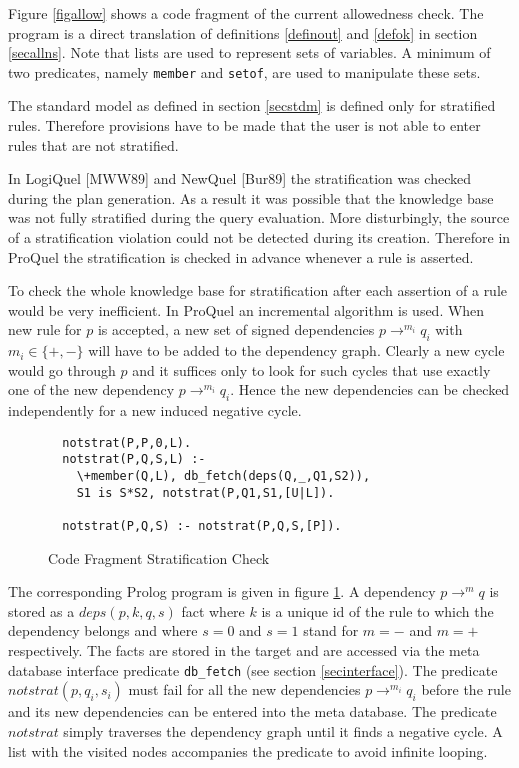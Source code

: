 Figure \ref{figallow} shows a code fragment of the current allowedness check. The program is a 
direct translation of definitions \ref{definout} and \ref{defok} in section \ref{secallns}. 
Note that lists are used to represent sets of variables. A minimum of two predicates, namely 
\verb.member. and \verb.setof., are used to manipulate these sets.

\label{secstratc}
The standard model as defined in section \ref{secstdm} is defined only for stratified rules. 
Therefore provisions have to be made that the user is not able to enter rules that are not 
stratified.

In LogiQuel [MWW89] and NewQuel [Bur89] the stratification was checked during the plan generation. 
As a result it was possible that the knowledge base was not fully stratified during the query 
evaluation. More disturbingly, the source of a stratification violation could not be detected 
during its creation. Therefore in ProQuel the stratification is checked  in advance whenever 
a rule is asserted.

To check the whole knowledge base for stratification after each assertion of a rule would be
very inefficient. In ProQuel an incremental algorithm is used. When new rule for $p$ is accepted,
a new set of signed dependencies $p \rightarrow^{m_i} q_i$ with $m_i \in \{+,-\}$ will have to be 
added to the dependency graph. Clearly a new cycle would go through $p$ and it suffices only to look
for such cycles that use exactly one of the new dependency $p \rightarrow^{m_i} q_i$. Hence the 
new dependencies can be checked independently for a new induced negative cycle.

\begin{figure}
{\small
\begin{verbatim}
  notstrat(P,P,0,L).
  notstrat(P,Q,S,L) :- 
    \+member(Q,L), db_fetch(deps(Q,_,Q1,S2)), 
    S1 is S*S2, notstrat(P,Q1,S1,[U|L]).

  notstrat(P,Q,S) :- notstrat(P,Q,S,[P]).
\end{verbatim}
}
\caption{Code Fragment Stratification Check}
\label{prgstratc}
\end{figure}

The corresponding Prolog program is given in figure \ref{prgstratc}. A dependency $p 
\rightarrow^{m} q$ is stored as a $deps(p,k,q,s)$ fact where $k$ is a unique id of the rule to
which the dependency belongs and where $s=0$ and $s=1$ stand for $m=-$ and $m=+$ respectively. The 
facts are stored in the target and are accessed via the meta database interface predicate 
\verb.db_fetch. (see section \ref{secinterface}). The predicate $notstrat(p,q_i,s_i)$ must 
fail for all the new dependencies $p \rightarrow^{m_i} q_i$ before the rule and its new 
dependencies can be entered into the meta database. The predicate $notstrat$ simply traverses 
the dependency graph until it finds a negative cycle. A list with the visited nodes accompanies 
the predicate to avoid infinite looping.

